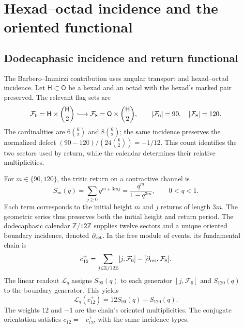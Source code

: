 \section{Hexad--octad incidence and the oriented functional}
\subsection{Dodecaphasic incidence and return functional}

The Barbero--Immirzi contribution uses angular transport and
hexad--octad incidence. Let $\mathsf H\subset\mathsf O$ be a hexad
and an octad with the hexad's marked pair preserved. The relevant flag
sets are
\begin{equation}
 \mathcal F_6=\mathsf H\times\binom{\mathsf H}{2}
 \lhook\joinrel\longrightarrow
 \mathcal F_8=\mathsf O\times\binom{\mathsf H}{2},
 \qquad |\mathcal F_6|=90,\quad |\mathcal F_8|=120.
 \label{iii:eq:barbero-flags}
\end{equation}
The cardinalities are $6\binom62$ and $8\binom62$; the same incidence
preserves the normalized defect
$(90-120)/(24\binom62)=-1/12$. This count identifies the two sectors
used by return, while the calendar determines their
relative multiplicities.

For $m\in\{90,120\}$, the tritic return on a contractive channel is
\begin{equation}
 S_m(q)=\sum_{j\geq0}q^{m+3mj}
       =\frac{q^m}{1-q^{3m}},\qquad 0<q<1.
 \label{iii:eq:barbero-return-series}
\end{equation}
Each term corresponds to the initial height $m$ and $j$ returns of
length $3m$. The geometric series thus preserves both the initial
height and return period. The dodecaphasic calendar
$\mathbb Z/12\mathbb Z$ supplies twelve sectors and a unique oriented
boundary incidence, denoted $\partial_{\rm ret}$. In the free
module of events, its fundamental chain is
\begin{equation}
 c_{12}^{+}
 =\sum_{j\in\mathbb Z/12\mathbb Z}[j,\mathcal F_6]
  -[\partial_{\rm ret},\mathcal F_8].
 \label{iii:eq:barbero-cycle}
\end{equation}
The linear readout $\mathscr L_q$ assigns $S_{90}(q)$ to each generator
$[j,\mathcal F_6]$ and $S_{120}(q)$ to the boundary generator. This yields
\begin{equation}
 \mathscr L_q(c_{12}^{+})=12S_{90}(q)-S_{120}(q).
 \label{iii:eq:barbero-weights}
\end{equation}
The weights $12$ and $-1$ are the chain's oriented multiplicities.
The conjugate orientation satisfies $c_{12}^{-}=-c_{12}^{+}$, with the
same incidence types.

